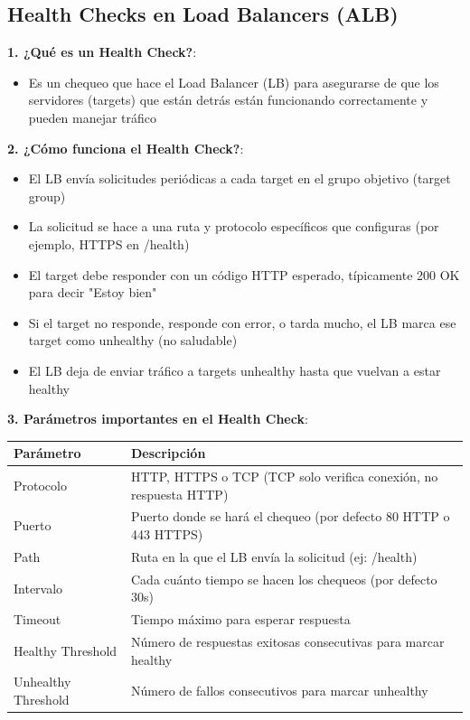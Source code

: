 \documentclass[12pt,a4paper]{report}
\begin{document}
\subsection{Health Checks en Load Balancers (ALB)}

\textbf{1. ¿Qué es un Health Check?}:
\begin{itemize}
    \item Es un chequeo que hace el Load Balancer (LB) para asegurarse de que los servidores (targets) que están detrás están funcionando correctamente y pueden manejar tráfico
\end{itemize}

\textbf{2. ¿Cómo funciona el Health Check?}:
\begin{itemize}
    \item El LB envía solicitudes periódicas a cada target en el grupo objetivo (target group)
    \item La solicitud se hace a una ruta y protocolo específicos que configuras (por ejemplo, HTTPS en /health)
    \item El target debe responder con un código HTTP esperado, típicamente 200 OK para decir "Estoy bien"
    \item Si el target no responde, responde con error, o tarda mucho, el LB marca ese target como unhealthy (no saludable)
    \item El LB deja de enviar tráfico a targets unhealthy hasta que vuelvan a estar healthy
\end{itemize}

\textbf{3. Parámetros importantes en el Health Check}:

\begin{center}
\begin{longtable}{|p{4cm}|p{9cm}|}
\hline
\cellcolor{awsblue!20}\textbf{Parámetro} & \cellcolor{awsblue!20}\textbf{Descripción} \\
\hline
Protocolo & HTTP, HTTPS o TCP (TCP solo verifica conexión, no respuesta HTTP) \\
\hline
Puerto & Puerto donde se hará el chequeo (por defecto 80 HTTP o 443 HTTPS) \\
\hline
Path & Ruta en la que el LB envía la solicitud (ej: /health) \\
\hline
Intervalo & Cada cuánto tiempo se hacen los chequeos (por defecto 30s) \\
\hline
Timeout & Tiempo máximo para esperar respuesta \\
\hline
Healthy Threshold & Número de respuestas exitosas consecutivas para marcar healthy \\
\hline
Unhealthy Threshold & Número de fallos consecutivos para marcar unhealthy \\
\hline
\end{longtable}
\end{center}
\end{document}
